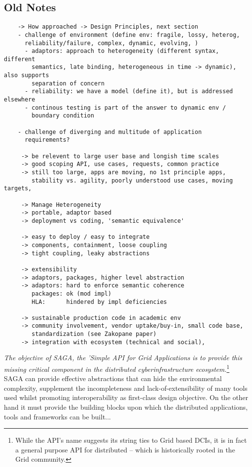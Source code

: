 \documentclass[a4paper,10pt]{article}
\begin{document}
 \subsection{Old Notes}

\begin{verbatim}
    -> How approached -> Design Principles, next section
    - challenge of environment (define env: fragile, lossy, heterog,
      reliability/failure, complex, dynamic, evolving, ) 
      - adaptors: approach to heterogeneity (different syntax, different
        semantics, late binding, heterogeneous in time -> dynamic), also supports 
        separation of concern
      - reliability: we have a model (define it), but is addressed elsewhere
      - continous testing is part of the answer to dynamic env /
        boundary condition

    - challenge of diverging and multitude of application
      requirements?

     -> be relevent to large user base and longish time scales
     -> good scoping API, use cases, requests, common practice
     -> still too large, apps are moving, no 1st principle apps,
        stability vs. agility, poorly understood use cases, moving targets, 

     -> Manage Heterogeneity
     -> portable, adaptor based
     -> deployment vs coding, 'semantic equivalence'
  
     -> easy to deploy / easy to integrate
     -> components, containment, loose coupling
     -> tight coupling, leaky abstractions
  
     -> extensibility
     -> adaptors, packages, higher level abstraction
     -> adaptors: hard to enforce semantic coherence
        packages: ok (mod impl)
        HLA:      hindered by impl deficiencies
  
     -> sustainable production code in academic env
     -> community involvement, vendor uptake/buy-in, small code base,
        standardization (see Zakopane paper)
     -> integration with ecosystem (technical and social), 
   \end{verbatim}

 {\it The objective of SAGA, the 'Simple API for Grid Applications is
   to provide this missing critical component in the distributed
   cyberinfrastructure ecosystem.}\footnote{While the API's name
   suggests its string ties to Grid based DCIs, it is in fact a
   general purpose API for distributed -- which is historically rooted
   in the Grid community.}  SAGA can provide effective abstractions
 that can hide the environmental complexity, supplement the
 incompleteness and lack-of-extensibility of many tools used whilst
 promoting interoperability as first-class design objective.  On the
 other hand it must provide the building blocks upon which the
 distributed applications, tools and frameworks can be built...
\end{document}
